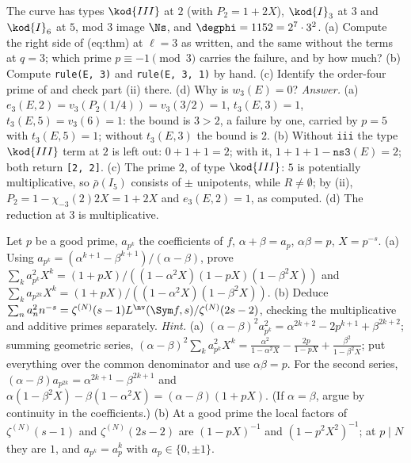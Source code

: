 \begin{sloppypar}
\begin{exercise}\label{ex:paper:726a1}
The curve  has types $\kod{III}$ at $2$ (with $P_2=1+2X$), $\kod{I}_3$ at $3$ and $\kod{I}_6$ at $5$, mod $3$ image $\Ns$, and $\degphi=1152=2^7\cdot3^2$. (a) Compute the right side of
(eq:thm) at $\ell=3$ as written, and the same without the terms at $q=3$; which prime $p\equiv-1\pmod3$ carries the failure, and by how much? (b) Compute \texttt{rule(E, 3)} and
\texttt{rule(E, 3, 1)} by hand. (c) Identify the order-four prime of  and check part (ii) there. (d) Why is $w_3(E)=0$?
\emph{Answer.} (a) $e_3(E,2)=v_3(P_2(1/4))=v_3(3/2)=1$, $t_3(E,3)=1$, $t_3(E,5)=v_3(6)=1$: the bound is $3>2$, a failure by one, carried by $p=5$ with $t_3(E,5)=1$; without $t_3(E,3)$ the
bound is $2$. (b) Without \texttt{iii} the type $\kod{III}$ term at $2$ is left out: $0+1+1=2$; with it, $1+1+1-\texttt{ns3}(E)=2$; both return \texttt{[2, 2]}. (c) The prime $2$, of type $\kod{III}$: $5$
is potentially multiplicative, so $\bar\rho(I_5)$ consists of $\pm$ unipotents, while $R\ne\emptyset$; by (ii), $P_2=1-\chi_{-3}(2)2X=1+2X$ and $e_3(E,2)=1$, as computed. (d) The reduction at $3$ is
multiplicative.
\end{exercise}

\begin{exercise}\label{ex:paper:rankin}
Let $p$ be a good prime, $a_{p^k}$ the coefficients of $f$, $\alpha+\beta=a_p$, $\alpha\beta=p$, $X=p^{-s}$. (a) Using $a_{p^k}=(\alpha^{k+1}-\beta^{k+1})/(\alpha-\beta)$, prove
$\sum_ka_{p^k}^2X^k=(1+pX)/((1-\alpha^2X)(1-pX)(1-\beta^2X))$ and $\sum_ka_{p^{2k}}X^k=(1+pX)/((1-\alpha^2X)(1-\beta^2X))$. (b) Deduce $\sum_na_n^2n^{-s}=\zeta^{(N)}(s-1)L^{\nv}(\Sym f,s)/\zeta^{(N)}(2s-2)$, checking the
multiplicative and additive primes separately.
\emph{Hint.} (a) $(\alpha-\beta)^2a_{p^k}^2=\alpha^{2k+2}-2p^{k+1}+\beta^{2k+2}$; summing geometric series,
$(\alpha-\beta)^2\sum_ka_{p^k}^2X^k=\frac{\alpha^2}{1-\alpha^2X}-\frac{2p}{1-pX}+\frac{\beta^2}{1-\beta^2X}$; put everything over the common denominator and use $\alpha\beta=p$. For the second series,
$(\alpha-\beta)a_{p^{2k}}=\alpha^{2k+1}-\beta^{2k+1}$ and $\alpha(1-\beta^2X)-\beta(1-\alpha^2X)=(\alpha-\beta)(1+pX)$. (If $\alpha=\beta$, argue by continuity in the coefficients.) (b) At a good prime the
local factors of $\zeta^{(N)}(s-1)$ and $\zeta^{(N)}(2s-2)$ are $(1-pX)^{-1}$ and $(1-p^2X^2)^{-1}$; at $p\mid N$ they are $1$, and $a_{p^k}=a_p^k$ with $a_p\in\{0,\pm1\}$.
\end{exercise}


\end{sloppypar}

